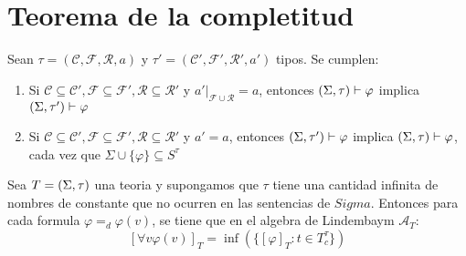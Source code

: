 
\section{Teorema de la completitud}

\begin{lemma}
  Sean $\tau=(\mathcal{C},\mathcal{F},\mathcal{R},a)$ y $\tau'=(\mathcal{C}',\mathcal{F}',\mathcal{R}',a')$ tipos. Se cumplen: \begin{enumerate}
    \item Si $\mathcal{C}\subseteq\mathcal{C}', \mathcal{F}\subseteq\mathcal{F}',\mathcal{R}\subseteq\mathcal{R}'$ y $a'|_{\mathcal{F}\cup\mathcal{R}}=a$,
    entonces $(\Sigma,\tau)\vdash\varphi$ implica $(\Sigma,\tau')\vdash\varphi$
    \item Si $\mathcal{C}\subseteq\mathcal{C}', \mathcal{F}\subseteq\mathcal{F}',\mathcal{R}\subseteq\mathcal{R}'$ y $a'=a$, entonces $(\Sigma,\tau')\vdash\varphi$
    implica $(\Sigma,\tau)\vdash\varphi$, cada vez que $\Sigma\cup\{\varphi\}\subseteq S^\tau$
  \end{enumerate} 
\end{lemma}
\noproof

\begin{lemma}
  Sea $T=(\Sigma,\tau)$ una teoria y supongamos que $\tau$ tiene una cantidad infinita de nombres de constante que no ocurren en las sentencias de $Sigma$.
  Entonces para cada formula $\varphi=_d\varphi(v)$, se tiene que en el algebra de Lindembaym $\mathcal{A}_T$:
  $$
  [\forall v\varphi(v)]_T=\inf(\{[\varphi]_T:t\in T_c^\tau\})
  $$
  
\end{lemma}

\noproof

